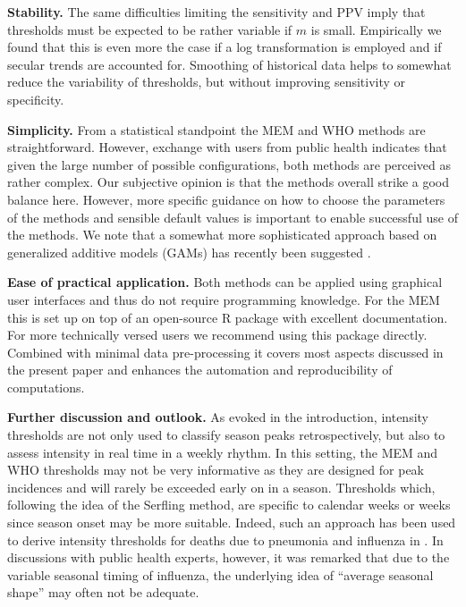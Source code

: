 \documentclass[12pt]{article}
\begin{document}
\begin{description}
\item \textbf{Stability.} The same difficulties limiting the sensitivity and PPV imply that thresholds must be expected to be rather variable if $m$ is small. Empirically we found that this is even more the case if a log transformation is employed and if secular trends are accounted for. Smoothing of historical data helps to somewhat reduce the variability of thresholds, but without improving sensitivity or specificity.
\item \textbf{Simplicity.} From a statistical standpoint the MEM and WHO methods are straightforward. However, exchange with users from public health indicates that given the large number of possible configurations, both methods are perceived as rather complex. Our subjective opinion is that the methods overall strike a good balance here. However, more specific guidance on how to choose the parameters of the methods and sensible default values is important to enable successful use of the methods. We note that a somewhat more sophisticated approach based on generalized additive models (GAMs) has recently been suggested \citep{Pang2023}.
\item \textbf{Ease of practical application.} Both methods can be applied using graphical user interfaces and thus do not require programming knowledge. For the MEM this is set up on top of an open-source R package with excellent documentation. For more technically versed users we recommend using this package directly. Combined with minimal data pre-processing it covers most aspects discussed in the present paper and enhances the automation and reproducibility of computations.
\end{description}

\noindent \textbf{Further discussion and outlook.} As evoked in the introduction, intensity thresholds are not only used to classify season peaks retrospectively, but also to assess intensity in real time in a weekly rhythm. In this setting, the MEM and WHO thresholds may not be very informative as they are designed for peak incidences and will rarely be exceeded early on in a season. Thresholds which, following the idea of the Serfling method, are specific to calendar weeks or weeks since season onset may be more suitable. Indeed, such an approach has been used to derive intensity thresholds for deaths due to pneumonia and influenza in \cite{Biggerstaff2017}. In discussions with public health experts, however, it was remarked that due to the variable seasonal timing of influenza, the underlying idea of ``average seasonal shape'' may often not be adequate.
\end{document}
